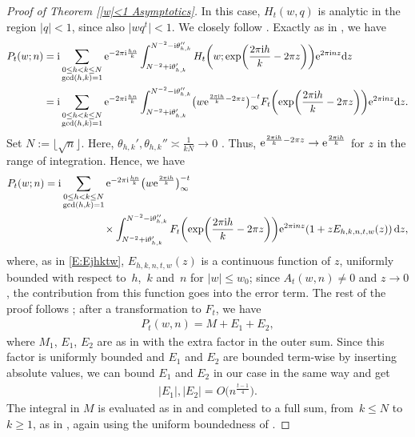 \documentclass[pdftex]{sigma}
\numberwithin{equation}{section}
\begin{document}
\begin{proof}[Proof of Theorem \ref{|w|<1 Asymptotics}]
In this case, $H_t(w,q)$ is analytic in the region $|q|<1$, since also ${\bigl|wq^t\bigr|<1}$. We closely follow \cite{Anderson}. Exactly as in \cite[p.~2598]{Anderson}, we have
\begin{align*}
P_t(w;n) &={\rm i}\sum_{\substack{0\leq h < k \leq N \\ \gcd(h,k)=1}}{\rm e}^{-2\pi {\rm i} \frac{hn}{k}}\int_{N^{-2}+{\rm i}\theta_{h,k}'}^{N^{-2}-{\rm i}\theta_{h,k}''}H_t\biggl(w;\exp\biggl( \frac{2\pi {\rm i} h}{k}-2\pi z\biggr)\biggr) {\rm e}^{2\pi {\rm i} n z} {\rm d}z \\
&={\rm i}\sum_{\substack{0\leq h < k \leq N \\ \gcd(h,k)=1}}{\rm e}^{-2\pi {\rm i} \frac{hn}{k}}\int_{N^{-2}+{\rm i}\theta_{h,k}'}^{N^{-2}-{\rm i}\theta_{h,k}''}\bigl(w {\rm e}^{\frac{2\pi {\rm i} h}{k}-2\pi z}\bigr)_{\infty}^{-t}F_t\biggl(\exp\biggl( \frac{2\pi {\rm i} h}{k}-2\pi z\biggr)\biggr) {\rm e}^{2\pi {\rm i} n z}{\rm d}z.
\end{align*} Set $N:=\lfloor \sqrt{n} \rfloor$.
 Here, $\theta_{h,k}',\theta_{h,k}'' \asymp \frac{1}{kN} \to 0$ \cite[p.~75]{Andrews}. Thus, ${\rm e}^{\frac{2\pi {\rm i} h}{k}-2\pi z} \to {\rm e}^{\frac{2\pi {\rm i} h}{k}}$ for $z$ in the range of integration. Hence, we have
 \begin{align*}
P_t(w;n)&{}={\rm i}\sum_{\substack{0\leq h < k \leq N \\ \gcd(h,k)=1}}{\rm e}^{-2\pi {\rm i} \frac{hn}{k}}\big(w{\rm e}^{\frac{2\pi {\rm i} h}{k}}\big)_{\infty}^{-t} \\
 & \hphantom{={\rm i}\sum_{\substack{0\leq h < k \leq N \\ \gcd(h,k)=1}}}\,{} \times \int_{N^{-2}+{\rm i}\theta_{h,k}'}^{N^{-2}-{\rm i}\theta_{h,k}''}F_t\biggl(\exp\biggl( \frac{2\pi {\rm i} h}{k}-2\pi z\biggr)\biggr) {\rm e}^{2\pi {\rm i} n z} (1+zE_{h,k,n,t,w}(z)) \,{\rm d}z,
\end{align*}
 where, as in \eqref{E:Ejhktw}, $E_{h,k,n,t,w}(z)$ is a continuous function of $z$, uniformly bounded with respect to~$h$,~$k$ and~$n$ for $|w|\leq w_0$; since $A_t(w,n) \neq 0$ and $z \to 0$, the contribution from this function goes into the error term. The rest of the proof follows \cite{Anderson}; after a transformation to $F_t$, we have
 \begin{align*}
 P_t(w,n)=M+E_1+E_2,
 \end{align*}
 where $M_1$, $E_1$, $E_2$ are as in \cite[p.~2599]{Anderson} with the extra factor  in the outer sum. Since this factor is uniformly bounded and $E_1$ and $E_2$ are bounded term-wise by inserting absolute values, we can bound $E_1$ and $E_2$ in our case in the same way and get
 \begin{align*}
|E_1|,|E_2|=O\big(n^{\frac{t-1}{4}}\big).
 \end{align*}
 The integral in $M$ is evaluated as in \cite[pp.~2602--2603]{Anderson} and completed to a full sum, from~${k \leq N}$ to~${k \geq 1}$, as in \cite[p.~2603, middle]{Anderson}, again using the uniform boundedness of .
\end{proof}
\end{document}
